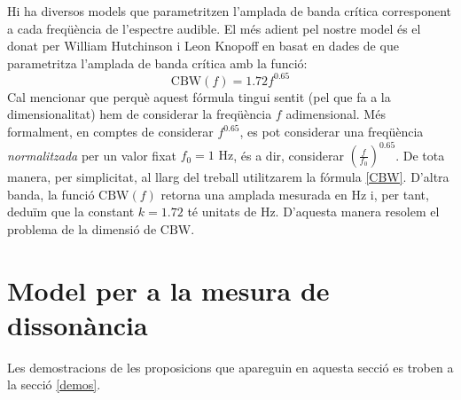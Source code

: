 \documentclass{article}
\theoremstyle{math}
\theoremstyle{TheoremNum}
\newcommand{\0}{\ensuremath{\vb{0}}}
\newcommand\Hz{\text{ Hz}}
\begin{document}
Hi ha diversos models que parametritzen l'amplada de banda crítica corresponent a cada freqüència de l'espectre audible. El més adient pel nostre model és el donat per William Hutchinson i Leon Knopoff en \cite{hutchinson} basat en dades de \cite{plomp,goodwin,mayer} que parametritza l'amplada de banda crítica amb la funció:
\begin{equation}
    \text{CBW}(f)=1.72 f^{0.65}
    \label{CBW}
\end{equation}
Cal mencionar que perquè aquest fórmula tingui sentit (pel que fa a la dimensionalitat) hem de considerar la freqüència $f$ adimensional. Més formalment, en comptes de considerar $f^{0.65}$, es pot considerar una freqüència \textit{normalitzada} per un valor fixat $f_0=1\Hz$, és a dir, considerar ${\left(\frac{f}{f_0}\right)}^{0.65}$. De tota manera, per simplicitat, al llarg del treball utilitzarem la fórmula \eqref{CBW}. D'altra banda, la funció $\text{CBW}(f)$ retorna una amplada mesurada en Hz i, per tant, deduïm que la constant $k=1.72$ té unitats de Hz. D'aquesta manera resolem el problema de la dimensió de $\text{CBW}$.
\section{Model per a la mesura de dissonància}\label{model}
Les demostracions de les proposicions que apareguin en aquesta secció es troben a la secció \ref{demos}.
\end{document}
